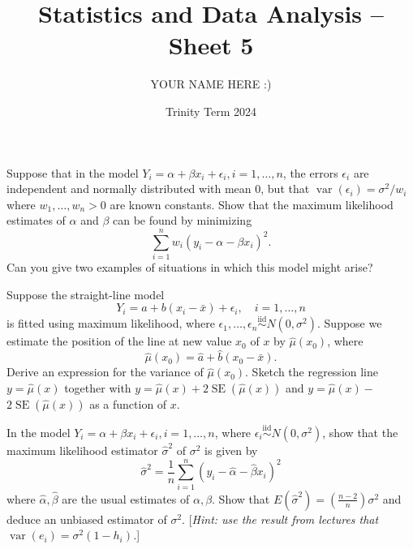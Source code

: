 \documentclass[answers]{exam}
\title{Statistics and Data Analysis -- Sheet 5}
\author{YOUR NAME HERE :)}
\date{Trinity Term 2024}
\begin{document}
\maketitle
\begin{questions}

\question%
Suppose that in the model $Y_{i}=\alpha+\beta x_{i}+\epsilon_{i}, i=1, \ldots, n$, the errors $\epsilon_{i}$ are independent and normally distributed with mean 0, but that $\operatorname{var}\left(\epsilon_{i}\right)=\sigma^{2} / w_{i}$ where $w_{1}, \ldots, w_{n}>0$ are known constants. Show that the maximum likelihood estimates of $\alpha$ and $\beta$ can be found by minimizing \[
	\sum_{i=1}^{n} w_{i}\left(y_{i}-\alpha-\beta x_{i}\right)^{2}.
\] Can you give two examples of situations in which this model might arise?



\question%
Suppose the straight-line model \[
	Y_{i}=a+b\left(x_{i}-\bar{x}\right)+\epsilon_{i}, \quad i=1, \ldots, n
\] is fitted using maximum likelihood, where $\epsilon_{1}, \ldots, \epsilon_{n} \stackrel{\text{iid}}{\sim} N\left(0, \sigma^{2}\right)$. Suppose we estimate the position of the line at new value $x_{0}$ of $x$ by $\widehat{\mu}\left(x_{0}\right)$, where \[
	\widehat{\mu}(x_{0})=\widehat{a}+\widehat{b}(x_{0}-\bar{x}).
\] Derive an expression for the variance of $\widehat{\mu}\left(x_{0}\right)$. Sketch the regression line $y=\widehat{\mu}(x)$ together with $y=\widehat{\mu}(x)+2 \operatorname{SE}(\widehat{\mu}(x))$ and $y=\widehat{\mu}(x)-$ $2 \operatorname{SE}(\widehat{\mu}(x))$ as a function of $x$.



\question%
\begin{subparts}
\subpart In the model $Y_{i}=\alpha+\beta x_{i}+\epsilon_{i}, i=1, \ldots, n$, where $\epsilon_{i} \stackrel{\text {iid}}{\sim} N\left(0, \sigma^{2}\right)$, show that the maximum likelihood estimator $\widehat{\sigma}^{2}$ of $\sigma^{2}$ is given by \[
	\widehat{\sigma}^{2}=\frac{1}{n} \sum_{i=1}^{n}\left(y_{i}-\widehat{\alpha}-\widehat{\beta} x_{i}\right)^{2}
\] where $\widehat{\alpha}, \widehat{\beta}$ are the usual estimates of $\alpha, \beta$.
\subpart Show that $E\left(\widehat{\sigma}^{2}\right)=\left(\frac{n-2}{n}\right) \sigma^{2}$ and deduce an unbiased estimator of $\sigma^{2}$. [\emph{Hint: use the result from lectures that $\operatorname{var}\left(e_{i}\right)=\sigma^{2}\left(1-h_{i}\right)$.}]
\end{subparts}




\end{questions}
\end{document}
